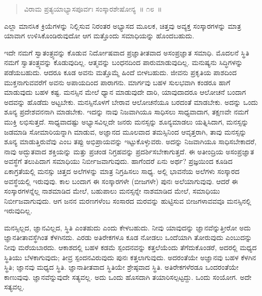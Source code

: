 \vspace{-0.3cm}

\begin{verse}
ವಿರಾಮ ಪ್ರತ್ಯಯಾಭ್ಯಾಸಪೂರ್ವಃ ಸಂಸ್ಕಾರಶೇಷೋನ್ಯ~॥ ೧೮~॥
\end{verse}

\vspace{-0.3cm}

ಎಲ್ಲಾ ಮಾನಸಿಕ ಕ್ರಿಯೆಗಳನ್ನು ನಿಲ್ಲಿಸುವ ನಿರಂತರ ಅಭ್ಯಾಸದ ಮೂಲಕ, ಚಿತ್ತವು ಅವ್ಯಕ್ತ ಸಂಸ್ಕಾರಗಳನ್ನು ಮಾತ್ರ ಯಾವಾಗ ಉಳಿಸಿಕೊಂಡಿರುವುದೋ ಆಗ ಮತ್ತೊಂದು ಸಮಾಧಿಯನ್ನು ಹೊಂದಬಹುದು. 

ಇದೇ ನಮಗೆ ಸ್ವಾತಂತ್ರ್ಯವನ್ನು ಕೊಡುವ ನಿರ್ದೋಷವಾದ ಪ್ರಜ್ಞಾತೀತವಾದ ಅಸಂಪ್ರ\break ಜ್ಞಾತ ಸಮಾಧಿ. ಮೊದಲನೆ ಸ್ಥಿತಿ ನಮಗೆ ಸ್ವಾತಂತ್ರ್ಯವನ್ನು ಕೊಡುವುದಿಲ್ಲ. ಆತ್ಮವನ್ನು ಬಂಧನದಿಂದ ಪಾರುಮಾಡುವುದಿಲ್ಲ. ಮನುಷ್ಯನು ಸಿದ್ಧಿಗಳನ್ನು ಪಡೆಯಬಹುದು. ಆದರೂ ಕೂಡ ಅವನು ಮತ್ತೊಮ್ಮೆ ಹಿಂದೆ ಬೀಳಬಹುದು. ಜೀವನು ಪ್ರಕೃತಿಯ ಪಾಶದಿಂದ ಮುಕ್ತನಾಗುವವರೆಗೆ ಅವನು ಅಪಾಯದಿಂದ ಪಾರಾಗನು. ಮಾರ್ಗವು ಬಹಳ ಸುಲಭವಾಗಿ ಕಂಡರೂ ಹಾಗೆ ಮಾಡುವುದು ಬಹಳ ಕಷ್ಟ. ಮನಸ್ಸಿನ ಮೇಲೆ ಧ್ಯಾನ ಮಾಡುವುದೇ ದಾರಿ, ಯಾವುದಾದರೂ ಆಲೋಚನೆ ಬಂದಾಗ ಅದವನ್ನು ಹೊಡೆದು ಅಟ್ಟಬೇಕು. ಮನಸ್ಸಿ\break ನೊಳಗೆ ಬೇರಾವ ಆಲೋಚನೆಯೂ ಬರದಂತೆ ಮಾಡಬೇಕು. ಅದನ್ನು ಒಂದು ಶೂನ್ಯ ಪ್ರದೇಶವನನಾಗಿ ಮಾಡಬೇಕು. ಇದನ್ನು ನಾವು ನಿಜವಾಗಿಯೂ ಸಾಧಿಸಲು ಸಾಧ್ಯವಾದಾಗ, ತಕ್ಷಣವೇ ನಮಗೆ ಮುಕ್ತಿ ಲಭಿಸುತ್ತದೆ. ಸಾಧ್ಯವಾದಷ್ಟು ಅಭ್ಯಾಸವಿಲ್ಲದೇ ಜನರು ಮನಸ್ಸನ್ನು ಶೂನ್ಯಮಾಡಲು ಯತ್ನಿಸಿದಾಗ, ಮನಸ್ಸನ್ನು ಜಡಮಾಡಿ ಸೋಮಾರಿಯನ್ನಾಗಿ ಮಾಡುವ, ಅಜ್ಞಾನದ ಮೂಲವಾದ ತಮಸ್ಸಿನಿಂದ ಆವೃತ್ತರಾಗಿ, ತಾವು ಮನಸ್ಸನ್ನು ಶೂನ್ಯ ಮಾಡುತ್ತಿರುವೆವು ಎಂಬ ತಪ್ಪು ಅಭಿಪ್ರಾಯವನ್ನು ಇಟ್ಟುಕೊಳ್ಳುವರು. ಅದನ್ನು ನಿಜವಾಗಿಯೂ ಸಾಧಿಸಬೇಕಾದರೆ, ನಾವು ಅದ್ಭುತವಾದ ಶಕ್ತಿಯನ್ನು ಮತ್ತು ಪ್ರಚಂಡ ನಿಗ್ರಹವನ್ನು ಪ್ರದರ್ಶಿಸಬೇಕಾಗುತ್ತದೆ. ಈ ಅತೀಂದ್ರಿಯ ಅಸಂಪ್ರಜ್ಞಾತ ಅವಸ್ಥೆಗೆ ತಲುಪಿದಾಗ ಸಮಾಧಿಯು ನಿರ್ಬೀಜವಾಗುವುದು. ಹಾಗೆಂದರೆ ಏನು ಅರ್ಥ? ಪ್ರಜ್ಞಯಿಂದ ಕೂಡಿದ ಏಕಾಗ್ರತೆಯಲ್ಲಿ ಮನಸ್ಸು ಚಿತ್ತದ ಅಲೆಗಳನ್ನು ಮಾತ್ರ ನಿಗ್ರಹಿಸಲು ಸಾಧ್ಯ. ಅಲ್ಲಿ ಭಾವನೆಯ ಅಲೆಗಳು ಸಂಸ್ಕಾರದ ಅವಸ್ಥೆಯಲ್ಲಿ ಇರುವುವು. ಕಾಲ ಬಂದಾಗ ಈ ಸಂಸ್ಕಾರಗಳೇ (ಬೀಜಗಳೇ) ಪುನಃ ಅಲೆಯಾಗುವುವು. ಆದರೆ ಈ ಸಂಸ್ಕಾರಗಳನ್ನೆಲ್ಲ ನಾಶಮಾಡಿದ ಮೇಲೆ, ಬಹುಪಾಲು ಮನಸ್ಸನ್ನೇ ನಾಶಮಾಡಿದ ಮೇಲೆ, ಸಮಾಧಿಯು ನಿರ್ಬೀಜವಾಗುವುದು. ಆಗ ಜನನ ಮರಣಗಳೆಂಬ ಸಂಸಾರದ ಮರವನ್ನು ಹುಟ್ಟಿಸುವ ಬೀಜಗಳಾವವವೂ ಮನಸ್ಸಿನಲ್ಲಿ ಇರುವುದಿಲ್ಲ. 

ಮನಸ್ಸಿಲ್ಲದ, ಜ್ಞಾನವಿಲ್ಲದ, ಸ್ಥಿತಿ ಎಂತಹುದು ಎಂದು ಕೇಳಬಹುದು. ನೀವು ಯಾವುದನ್ನು ಜ್ಞಾನವೆನ್ನುತ್ತೀರೋ ಅದು ಜ್ಞಾನತೀತಾವಸ್ಥೆಗಿಂತ ಕೆಳಗಿನದು. ಎರಡು ಅತಿರೇಕಗಳೂ ಕೂಡ ನೋಡಲು ಒಂದೆಯಾಗಿ ತೋರುವುದು ಎಂಬುದನ್ನು ನೀವು ಮರೆಯಬಾರದು. ಆಕಾಶದಲ್ಲಿ ಬಹಳ ಕಡಮೆ ಸ್ಪಂದನವನ್ನು ಕತ್ತಲೆಯೆಂದು ತೆಗೆದುಕೊಂಡರೆ, ಅದರಲ್ಲಿ ಮಧ್ಯದ ಸ್ಥಿತಿಯು ಬೆಳಕಾಗುವುದು; ತೀವ್ರ ಸ್ಪಂದನವಿರುವುದು ಪುನಃ ಕತ್ತಲಾಗುವುದು. ಅದರಂತೆಯೇ ಅಜ್ಞಾನವು ಬಹಳ ಕೆಳಗಿನ ಸ್ಥಿತಿ; ಜ್ಞಾನವು ಮಧ್ಯದ ಸ್ಥಿತಿ. ಜ್ಞಾನಾತೀತವಾದ ಸ್ಥಿತಿಯೇ ಶ್ರೇಷ್ಠವಾದ ಸ್ಥಿತಿ. ಅತಿರೇಕಗಳೆರಡೂ ಒಂದರಂತೆಯೇ ಕಾಣುವುವು. ಜ್ಞಾನವೆನ್ನುವುದೇ ಸತ್ಯವಲ್ಲ. ಅದು ಒಂದು ಹೊಸದಾಗಿ ತಯಾರಿಸಲ್ಪಟ್ಟದ್ದು. ಒಂದು ಸಂಯೋಗ. ಅದೇ ಸತ್ಯವಲ್ಲ. 

